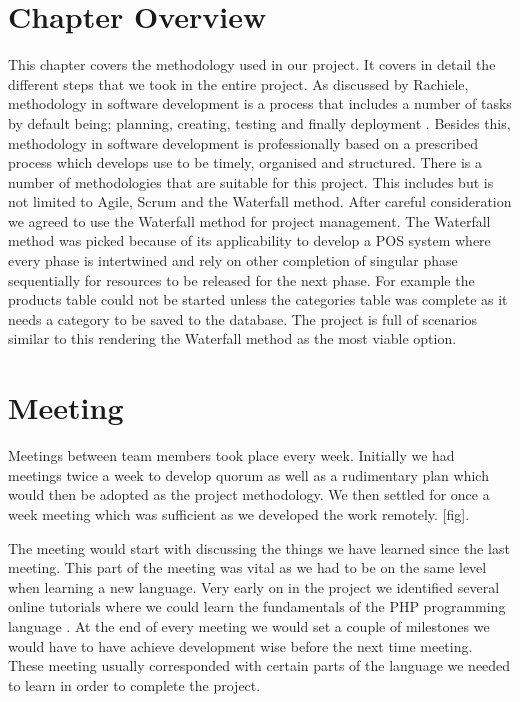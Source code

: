 \section{Chapter Overview}

This chapter covers the methodology used in our project. It covers in detail the different steps that we took in the entire project. As discussed by Rachiele, methodology in software development is a process that includes a number of tasks by default being; planning, creating, testing and finally deployment \cite{SDM}. Besides this, methodology in software development is professionally based on a prescribed process which develops use to be timely, organised and structured.  
\newline
\newline
There is a number of methodologies that are suitable for this project. This includes but is not limited to Agile, Scrum and the Waterfall method. After careful consideration we agreed to use the Waterfall method for project management. 
\newline
\newline
The Waterfall method was picked because of its applicability to develop a POS system where every phase is intertwined and rely on other completion of singular phase sequentially for resources to be released for the next phase. For example the products table could not be started unless the categories table was complete as it needs a category to be saved to the database. The project is full of scenarios similar to this rendering the Waterfall method as the most viable option.


\section{Meeting}

Meetings between team members took place every week. Initially we had meetings twice a week to develop quorum as well as a rudimentary plan which would then be adopted as the project methodology. We then settled for once a week meeting which was sufficient as we developed the work remotely. [fig].


The meeting would start with discussing the things we have learned since the last meeting. This part of the meeting was vital as we had to be on the same level when learning a new language. Very early on in the project we identified several online tutorials where we could learn the fundamentals of the PHP programming language \cite{W3}. At the end of every meeting we would set a couple of milestones we would have to have achieve development wise before the next time meeting. These meeting usually corresponded with certain parts of the language we needed to learn in order to complete the project. 






